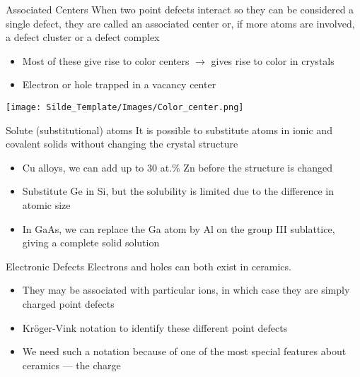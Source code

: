 \documentclass{libs/XJTLU_format}
\begin{document}
\begin{frame}{Associated Centers}
    When two point defects interact so they can be considered a single defect, they are called an associated center or, if more atoms are involved, a defect cluster or a defect complex \pause
    
    \begin{itemize}
        \item Most of these give rise to color centers $\rightarrow$ gives rise to color in crystals \pause
        \item Electron or hole trapped in a vacancy center
    \end{itemize}
    
    \centering
    \texttt{[image: Silde\_Template/Images/Color\_center.png]} \\[0.3cm]
\end{frame}

\begin{frame}{Solute (substitutional) atoms}
It is possible to substitute atoms in ionic and covalent solids without changing the crystal structure\\[0.3cm] \pause

\begin{itemize}
    \item Cu alloys, we can add up to 30 at.\% Zn before the structure is changed \pause
    \item Substitute Ge in Si, but the solubility is limited due to the difference in atomic size \pause
    \item In GaAs, we can replace the Ga atom by Al on the group III sublattice, giving a complete solid solution 
\end{itemize}
    
\end{frame}

\begin{frame}{Electronic Defects}
    Electrons and holes can both exist in ceramics. \pause
    
    \begin{itemize}
        \item They may be associated with particular ions, in which case they are simply charged point defects \pause
        \item Kröger-Vink notation to identify these different point defects \pause
        \item We need such a notation because of one of the most special features about ceramics — the charge
    \end{itemize}
    
\end{frame}
\end{document}

